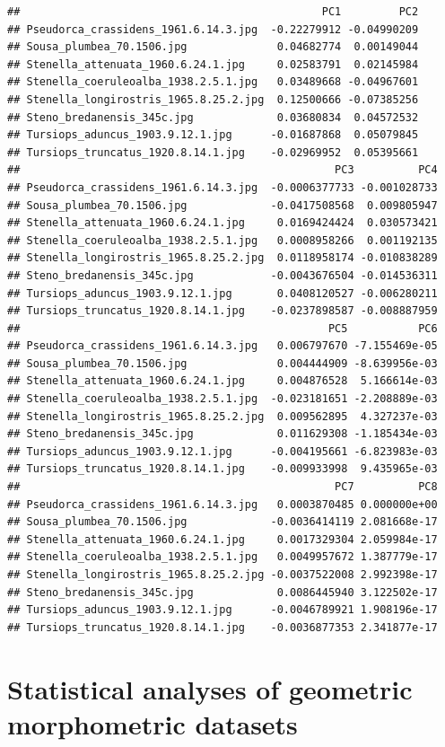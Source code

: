 \documentclass[]{book}
\begin{document}
\begin{verbatim}
##                                               PC1         PC2
## Pseudorca_crassidens_1961.6.14.3.jpg  -0.22279912 -0.04990209
## Sousa_plumbea_70.1506.jpg              0.04682774  0.00149044
## Stenella_attenuata_1960.6.24.1.jpg     0.02583791  0.02145984
## Stenella_coeruleoalba_1938.2.5.1.jpg   0.03489668 -0.04967601
## Stenella_longirostris_1965.8.25.2.jpg  0.12500666 -0.07385256
## Steno_bredanensis_345c.jpg             0.03680834  0.04572532
## Tursiops_aduncus_1903.9.12.1.jpg      -0.01687868  0.05079845
## Tursiops_truncatus_1920.8.14.1.jpg    -0.02969952  0.05395661
##                                                 PC3          PC4
## Pseudorca_crassidens_1961.6.14.3.jpg  -0.0006377733 -0.001028733
## Sousa_plumbea_70.1506.jpg             -0.0417508568  0.009805947
## Stenella_attenuata_1960.6.24.1.jpg     0.0169424424  0.030573421
## Stenella_coeruleoalba_1938.2.5.1.jpg   0.0008958266  0.001192135
## Stenella_longirostris_1965.8.25.2.jpg  0.0118958174 -0.010838289
## Steno_bredanensis_345c.jpg            -0.0043676504 -0.014536311
## Tursiops_aduncus_1903.9.12.1.jpg       0.0408120527 -0.006280211
## Tursiops_truncatus_1920.8.14.1.jpg    -0.0237898587 -0.008887959
##                                                PC5           PC6
## Pseudorca_crassidens_1961.6.14.3.jpg   0.006797670 -7.155469e-05
## Sousa_plumbea_70.1506.jpg              0.004444909 -8.639956e-03
## Stenella_attenuata_1960.6.24.1.jpg     0.004876528  5.166614e-03
## Stenella_coeruleoalba_1938.2.5.1.jpg  -0.023181651 -2.208889e-03
## Stenella_longirostris_1965.8.25.2.jpg  0.009562895  4.327237e-03
## Steno_bredanensis_345c.jpg             0.011629308 -1.185434e-03
## Tursiops_aduncus_1903.9.12.1.jpg      -0.004195661 -6.823983e-03
## Tursiops_truncatus_1920.8.14.1.jpg    -0.009933998  9.435965e-03
##                                                 PC7          PC8
## Pseudorca_crassidens_1961.6.14.3.jpg   0.0003870485 0.000000e+00
## Sousa_plumbea_70.1506.jpg             -0.0036414119 2.081668e-17
## Stenella_attenuata_1960.6.24.1.jpg     0.0017329304 2.059984e-17
## Stenella_coeruleoalba_1938.2.5.1.jpg   0.0049957672 1.387779e-17
## Stenella_longirostris_1965.8.25.2.jpg -0.0037522008 2.992398e-17
## Steno_bredanensis_345c.jpg             0.0086445940 3.122502e-17
## Tursiops_aduncus_1903.9.12.1.jpg      -0.0046789921 1.908196e-17
## Tursiops_truncatus_1920.8.14.1.jpg    -0.0036877353 2.341877e-17
\end{verbatim}

\section{Statistical analyses of geometric morphometric
datasets}\label{statistical-analyses-of-geometric-morphometric-datasets}
\end{document}

